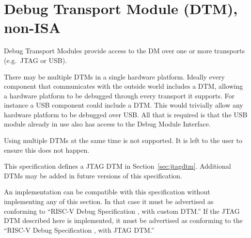 \chapter{Debug Transport Module (DTM), non-ISA} \label{dtm}

Debug Transport Modules provide access to the DM over one or more transports
(e.g.\ JTAG or USB).

There may be multiple DTMs in a single hardware platform. Ideally every component that
communicates with the outside world includes a DTM, allowing a hardware platform to be
debugged through every transport it supports.  For instance a USB component
could include a DTM. This would trivially allow any hardware platform to be debugged
over USB. All that is required is that the USB module already in use also has
access to the Debug Module Interface.

Using multiple DTMs at the same time is not supported. It is left to the user
to ensure this does not happen.

This specification defines a JTAG DTM in Section~\ref{sec:jtagdtm}. Additional DTMs
may be added in future versions of this specification.

An implementation can be compatible with this specification without implementing
any of this section. In that case it must be advertised as conforming to
``RISC-V Debug Specification \versionnum, with custom DTM.'' If the JTAG DTM
described here is implemented, it must be advertised as conforming to the
``RISC-V Debug Specification \versionnum, with JTAG DTM.''


